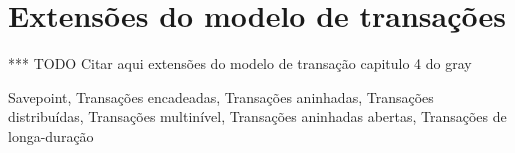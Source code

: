 \documentclass[11pt,twoside,a4paper]{book}
\begin{document}
\section{Extensões do modelo de transações}
\label{sec:extensoes}
*** TODO Citar aqui extensões do modelo de transação capitulo 4 do gray

Savepoint, Transações encadeadas, Transações aninhadas, Transações distribuídas, Transações multinível, Transações aninhadas abertas, Transações de longa-duração











\end{document}
